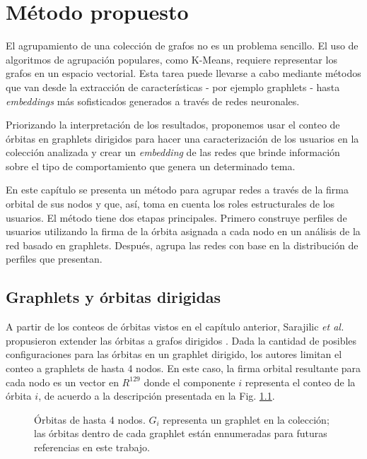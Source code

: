 %
\chapter{Método propuesto}
\label{sec:proposal}


El agrupamiento de una colección de grafos no es un problema sencillo. El uso de algoritmos de agrupación populares, como K-Means, requiere representar los grafos en un espacio vectorial. Esta tarea puede llevarse a cabo mediante métodos que van desde la extracción de características - por ejemplo graphlets - hasta \textit{embeddings} más sofisticados generados a través de redes neuronales. 

Priorizando la interpretación de los resultados, proponemos usar el conteo de órbitas en graphlets dirigidos para hacer una caracterización de los usuarios en la colección analizada y crear un \textit{embedding} de las redes que brinde información sobre el tipo de comportamiento que genera un determinado tema. 

En este capítulo se presenta un método para agrupar redes a través de la firma orbital de sus nodos y que, así, toma en cuenta los roles estructurales de los usuarios. El método tiene dos etapas principales. Primero construye perfiles de usuarios utilizando la firma de la órbita asignada a cada nodo en un análisis de la red basado en graphlets. Después, agrupa las redes con base en la distribución de perfiles que presentan. 

\section{Graphlets y órbitas dirigidas}

A partir de los conteos de órbitas vistos en el capítulo anterior, Sarajilic \textit{et al.} propusieron extender las órbitas a grafos dirigidos \cite{sarajlic_graphlet-based_2016}. Dada la cantidad de posibles configuraciones para las órbitas en un graphlet dirigido, los autores limitan el conteo a graphlets de hasta 4 nodos. En este caso, la firma orbital resultante para cada nodo es un vector en $R^{129}$ donde el componente $i$ representa el conteo de la órbita $i$, de acuerdo a la descripción presentada en la Fig. \ref{fig:orbits}.

 \begin{figure}[htbp]
   \centering
   
    \caption{Órbitas de hasta 4 nodos. $G_i$ representa un graphlet en la colección; las órbitas dentro de cada graphlet están ennumeradas para futuras referencias en este trabajo. }
    \label{fig:orbits}
\end{figure}


